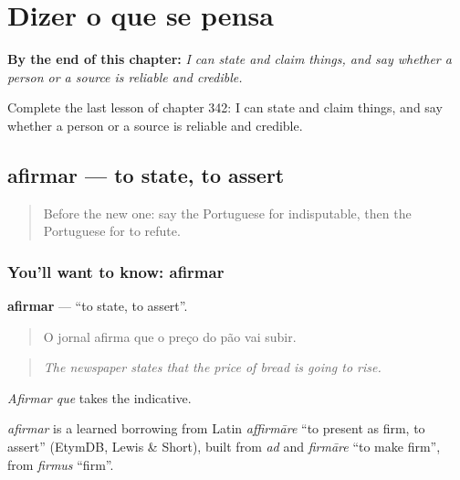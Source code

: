 
\chapter{Dizer o que se pensa}
\label{ch:pt-dizer-o-que-se-pensa}

\begin{chapteropening}
\textbf{By the end of this chapter:} \emph{I can state and claim things, and say whether a person or a source is reliable and credible.}

Complete the last lesson of chapter 342: I can state and claim things, and say whether a person or a source is reliable and credible.
\end{chapteropening}

\section[afirmar]{afirmar — to state, to assert}

\label{lesson:PT-C342-afirmar}



\begin{quote}
Before the new one: say the Portuguese for indisputable, then the Portuguese for to refute.
\end{quote}

\subsection*{You'll want to know: afirmar}
\textbf{afirmar} — \textquotedblleft{}to state, to assert\textquotedblright{}.

\begin{quote}
O jornal afirma que o preço do pão vai subir.
\end{quote}

\begin{quote}
\emph{The newspaper states that the price of bread is going to rise.}
\end{quote}

\emph{Afirmar que} takes the indicative.

\begin{cousinweb}
\emph{afirmar} is a learned borrowing from Latin \emph{affirmāre} \textquotedblleft{}to present as firm, to assert\textquotedblright{} (EtymDB, Lewis \& Short), built from \emph{ad} and \emph{firmāre} \textquotedblleft{}to make firm\textquotedblright{}, from \emph{firmus} \textquotedblleft{}firm\textquotedblright{}.
\end{cousinweb}

